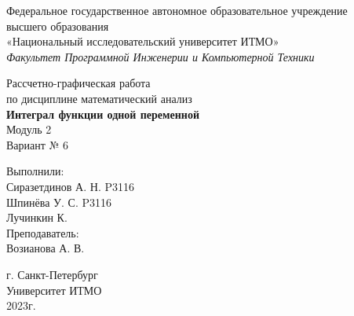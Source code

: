 \thispagestyle{empty} %
\begin{center}
	Федеральное государственное автономное образовательное учреждение\\ 
	высшего образования\\
	«Национальный исследовательский университет ИТМО»\\
	\textit{Факультет Программной Инженерии и Компьютерной Техники}\\
\end{center}
\vspace{2cm}
\begin{center}
	\large
	Рассчетно-графическая работа\\
	по дисциплине математический анализ\\
	\textbf{Интеграл функции одной переменной}\\
	Модуль 2\\
	Вариант № 6
\end{center}
\vspace{7cm}
\begin{flushright}
	Выполнили:\\
	Сиразетдинов А. Н. P3116\\
	Шпинёва У. С. P3116\\
	Лучинкин К.\\
	Преподаватель: \\
	Возианова А. В.\\
\end{flushright}
\vspace{6cm}
\begin{center}
	г. Санкт-Петербург\\
	Университет ИТМО\\
	2023г.
\end{center}